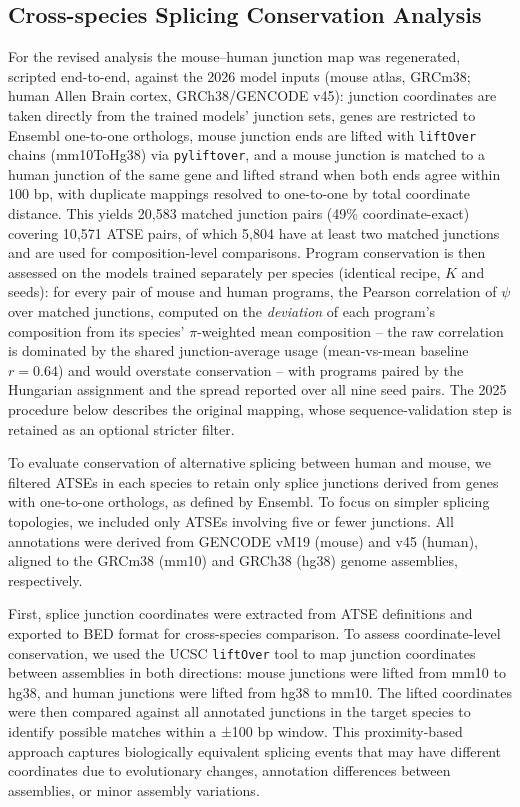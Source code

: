 \fi

\subsection*{Cross-species Splicing Conservation Analysis}
For the revised analysis the mouse--human junction map was regenerated, scripted end-to-end, against the 2026 model inputs (mouse atlas, GRCm38; human Allen Brain cortex, GRCh38/GENCODE v45): junction coordinates are taken directly from the trained models' junction sets, genes are restricted to Ensembl one-to-one orthologs, mouse junction ends are lifted with \texttt{liftOver} chains (mm10ToHg38) via \texttt{pyliftover}, and a mouse junction is matched to a human junction of the same gene and lifted strand when both ends agree within 100 bp, with duplicate mappings resolved to one-to-one by total coordinate distance. This yields 20{,}583 matched junction pairs (49\% coordinate-exact) covering 10{,}571 ATSE pairs, of which 5{,}804 have at least two matched junctions and are used for composition-level comparisons. Program conservation is then assessed on the models trained separately per species (identical recipe, $K$ and seeds): for every pair of mouse and human programs, the Pearson correlation of $\psi$ over matched junctions, computed on the \emph{deviation} of each program's composition from its species' $\pi$-weighted mean composition -- the raw correlation is dominated by the shared junction-average usage (mean-vs-mean baseline $r = 0.64$) and would overstate conservation -- with programs paired by the Hungarian assignment and the spread reported over all nine seed pairs. The 2025 procedure below describes the original mapping, whose sequence-validation step is retained as an optional stricter filter.

To evaluate conservation of alternative splicing between human and mouse, we filtered ATSEs in each species to retain only splice junctions derived from genes with one-to-one orthologs, as defined by Ensembl. To focus on simpler splicing topologies, we included only ATSEs involving five or fewer junctions. All annotations were derived from GENCODE vM19 (mouse) and v45 (human), aligned to the GRCm38 (mm10) and GRCh38 (hg38) genome assemblies, respectively.

First, splice junction coordinates were extracted from ATSE definitions and exported to BED format for cross-species comparison. To assess coordinate-level conservation, we used the UCSC \texttt{liftOver} tool to map junction coordinates between assemblies in both directions: mouse junctions were lifted from mm10 to hg38, and human junctions were lifted from hg38 to mm10. The lifted coordinates were then compared against all annotated junctions in the target species to identify possible matches within a ±100 bp window. This proximity-based approach captures biologically equivalent splicing events that may have different coordinates due to evolutionary changes, annotation differences between assemblies, or minor assembly variations.

